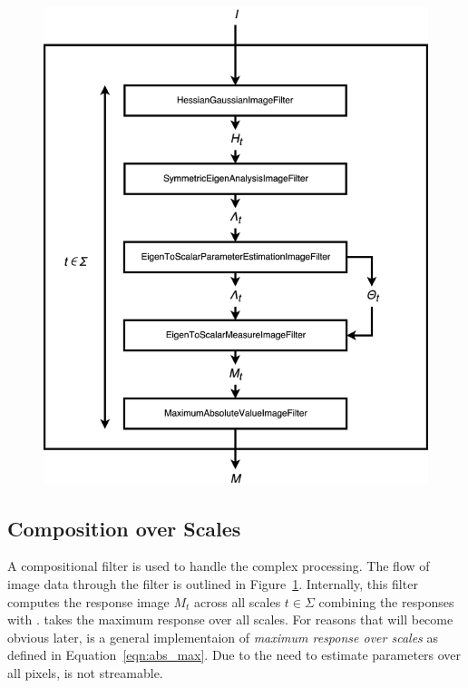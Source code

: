 \documentclass{InsightArticle}
\begin{document}
\begin{figure}
  \center
  \includegraphics[width=1.0\textwidth]{figures/MultiScaleHessianEnhancementImageFilter.eps}
  \label{fig:MultiScaleHessianEnhancementImageFilter}
\end{figure}

\subsection{Composition over Scales}
\label{design:MultiScaleHessianEnhancementImageFilter}
A compositional filter  is used to handle the complex processing.
The flow of image data through the filter is outlined in Figure~\ref{fig:MultiScaleHessianEnhancementImageFilter}.
Internally, this filter computes the response image $M_t$ across all scales $t \in \Sigma$ combining the responses with .
 takes the maximum response over all scales.
For reasons that will become obvious later,  is a 
general implementaion of \textit{maximum response over scales} as defined in Equation~\ref{eqn:abs_max}.
Due to the need to estimate parameters over all pixels,  is not streamable.
\end{document}
